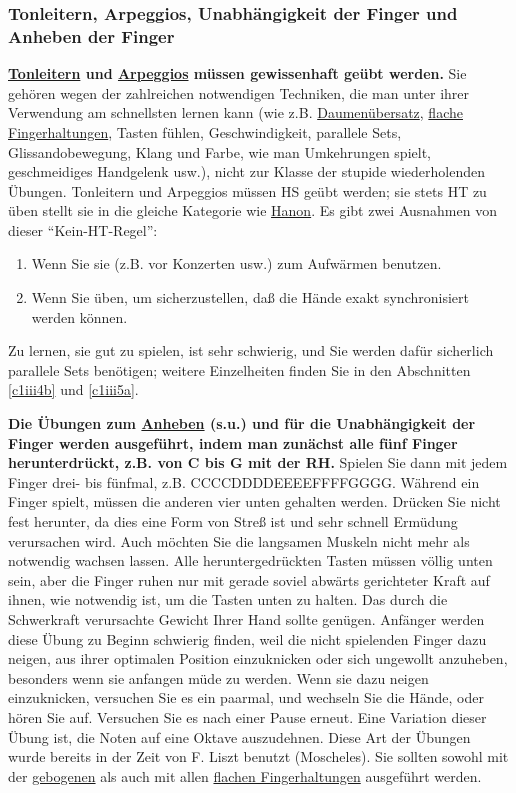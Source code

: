 
\subsubsection{Tonleitern, Arpeggios, Unabhängigkeit der Finger und Anheben der Finger}
\label{c1iii7d}

\textbf{\hyperref[c1iii5a]{Tonleitern} und \hyperref[Arpeggios]{Arpeggios} müssen gewissenhaft geübt werden.}
Sie gehören wegen der zahlreichen notwendigen Techniken, die man unter ihrer Verwendung am schnellsten lernen kann (wie z.B. \hyperref[c1iii5a]{Daumenübersatz}, \hyperref[c1iii4b]{flache Fingerhaltungen}, Tasten fühlen, Geschwindigkeit, parallele Sets, Glissandobewegung, Klang und Farbe, wie man Umkehrungen spielt, geschmeidiges Handgelenk usw.), nicht zur Klasse der stupide wiederholenden Übungen.
Tonleitern und Arpeggios müssen HS geübt werden; sie stets HT zu üben stellt sie in die gleiche Kategorie wie \hyperref[c1iii7h]{Hanon}.
Es gibt zwei Ausnahmen von dieser \enquote{Kein-HT-Regel}:

\begin{enumerate} 
 \item Wenn Sie sie (z.B. vor Konzerten usw.) zum Aufwärmen benutzen.
 \item Wenn Sie üben, um sicherzustellen, daß die Hände exakt synchronisiert werden können.
\end{enumerate}
Zu lernen, sie gut zu spielen, ist sehr schwierig, und Sie werden dafür sicherlich parallele Sets benötigen; weitere Einzelheiten finden Sie in den Abschnitten \hyperref[c1iii4b]{\autoref{c1iii4b}} und \hyperref[c1iii5a]{\autoref{c1iii5a}}.


\label{c1iii7finger}

\textbf{Die Übungen zum \hyperref[c1iii7anheben]{Anheben} (s.u.) und für die Unabhängigkeit der Finger werden ausgeführt, indem man zunächst alle fünf Finger herunterdrückt, z.B. von C bis G mit der RH.}
Spielen Sie dann mit jedem Finger drei- bis fünfmal, z.B. CCCCDDDDEEEEFFFFGGGG.
Während ein Finger spielt, müssen die anderen vier unten gehalten werden.
Drücken Sie nicht fest herunter, da dies eine Form von Streß ist und sehr schnell Ermüdung verursachen wird.
Auch möchten Sie die langsamen Muskeln nicht mehr als notwendig wachsen lassen.
Alle heruntergedrückten Tasten müssen völlig unten sein, aber die Finger ruhen nur mit gerade soviel abwärts gerichteter Kraft auf ihnen, wie notwendig ist, um die Tasten unten zu halten.
Das durch die Schwerkraft verursachte Gewicht Ihrer Hand sollte genügen.
Anfänger werden diese Übung zu Beginn schwierig finden, weil die nicht spielenden Finger dazu neigen, aus ihrer optimalen Position einzuknicken oder sich ungewollt anzuheben, besonders wenn sie anfangen müde zu werden.
Wenn sie dazu neigen einzuknicken, versuchen Sie es ein paarmal, und wechseln Sie die Hände, oder hören Sie auf.
Versuchen Sie es nach einer Pause erneut.
Eine Variation dieser Übung ist, die Noten auf eine Oktave auszudehnen.
Diese Art der Übungen wurde bereits in der Zeit von F. Liszt benutzt (Moscheles).
Sie sollten sowohl mit der \hyperref[c1ii2]{gebogenen} als auch mit allen \hyperref[c1iii4b]{flachen Fingerhaltungen} ausgeführt werden.

